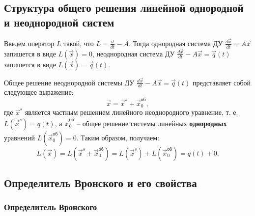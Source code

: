\subsection{Структура общего решения линейной однородной и неоднородной систем}
Введем оператор $L$ такой, что $L = \frac{d}{dt} - A$. Тогда однородная система ДУ $\frac{d \overrightarrow x}{dt} = A \overrightarrow x$ запишется в виде
$L(\overrightarrow x) = 0$, неоднородная система ДУ $\frac{d \overrightarrow x}{dt} - A \overrightarrow x = \overrightarrow{q}(t)$ запишется в виде $L(\overrightarrow x) = \overrightarrow{q}(t)$.

\begin{proposition}
    Общее решение неоднородной системы ДУ $\frac{d \overrightarrow x}{dt} - A \overrightarrow x = \overrightarrow{q}(t)$ представляет собой следующее выражение:
    \begin{equation}
        \overrightarrow x = \overrightarrow x^s + \overrightarrow x^{\text{об}}_0,
    \end{equation}
    где $\overrightarrow x^s$ является частным решением линейного неоднородного уравнение, т. е. $L(\overrightarrow x^s) = q(t)$, а
    $\overrightarrow x^{\text{об}}_0$ -- общее решение системы линейных \textbf{однородных} уравнений $L(\overrightarrow x^{\text{об}}_0) = 0$.
    Таким образом, получаем:
    \[L(\overrightarrow x) = L(\overrightarrow x^s + \overrightarrow x^{\text{об}}_0) = L(\overrightarrow x^s) + L(\overrightarrow x^{\text{об}}_0) = q(t) + 0.\]
\end{proposition}

\subsection{Определитель Вронского и его свойства}

\subsubsection{Определитель Вронского}

